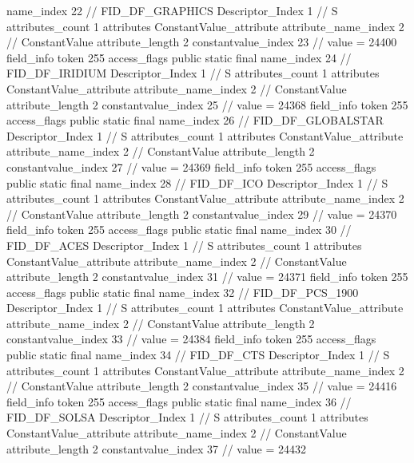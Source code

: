 {{{{{				name_index	22		// FID_DF_GRAPHICS
				Descriptor_Index	1		// S
				attributes_count	1
				attributes {
				ConstantValue_attribute {
					attribute_name_index	2		// ConstantValue
					attribute_length	2
					constantvalue_index	23		// value = 24400
				}
				}
			}
			field_info {
				token	255
				access_flags	public static final
				name_index	24		// FID_DF_IRIDIUM
				Descriptor_Index	1		// S
				attributes_count	1
				attributes {
				ConstantValue_attribute {
					attribute_name_index	2		// ConstantValue
					attribute_length	2
					constantvalue_index	25		// value = 24368
				}
				}
			}
			field_info {
				token	255
				access_flags	public static final
				name_index	26		// FID_DF_GLOBALSTAR
				Descriptor_Index	1		// S
				attributes_count	1
				attributes {
				ConstantValue_attribute {
					attribute_name_index	2		// ConstantValue
					attribute_length	2
					constantvalue_index	27		// value = 24369
				}
				}
			}
			field_info {
				token	255
				access_flags	public static final
				name_index	28		// FID_DF_ICO
				Descriptor_Index	1		// S
				attributes_count	1
				attributes {
				ConstantValue_attribute {
					attribute_name_index	2		// ConstantValue
					attribute_length	2
					constantvalue_index	29		// value = 24370
				}
				}
			}
			field_info {
				token	255
				access_flags	public static final
				name_index	30		// FID_DF_ACES
				Descriptor_Index	1		// S
				attributes_count	1
				attributes {
				ConstantValue_attribute {
					attribute_name_index	2		// ConstantValue
					attribute_length	2
					constantvalue_index	31		// value = 24371
				}
				}
			}
			field_info {
				token	255
				access_flags	public static final
				name_index	32		// FID_DF_PCS_1900
				Descriptor_Index	1		// S
				attributes_count	1
				attributes {
				ConstantValue_attribute {
					attribute_name_index	2		// ConstantValue
					attribute_length	2
					constantvalue_index	33		// value = 24384
				}
				}
			}
			field_info {
				token	255
				access_flags	public static final
				name_index	34		// FID_DF_CTS
				Descriptor_Index	1		// S
				attributes_count	1
				attributes {
				ConstantValue_attribute {
					attribute_name_index	2		// ConstantValue
					attribute_length	2
					constantvalue_index	35		// value = 24416
				}
				}
			}
			field_info {
				token	255
				access_flags	public static final
				name_index	36		// FID_DF_SOLSA
				Descriptor_Index	1		// S
				attributes_count	1
				attributes {
				ConstantValue_attribute {
					attribute_name_index	2		// ConstantValue
					attribute_length	2
					constantvalue_index	37		// value = 24432
				}
}}}}}}
